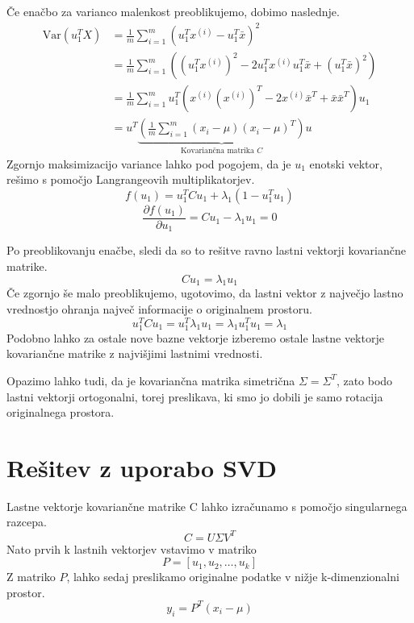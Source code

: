 Če enačbo za varianco malenkost preoblikujemo, dobimo naslednje. \cite{zupan2024uozp}
\begin{equation}
\begin{aligned}
\mathrm{Var}(u_1^TX) &= \frac{1}{m}\sum_{i=1}^{m}(u_1^Tx^{(i)} - u_1^T\bar{x})^2 \\
&= \frac{1}{m}\sum_{i=1}^{m}\left((u_1^Tx^{(i)})^2 - 2u_1^Tx^{(i)}u_1^T\bar{x} + (u_1^T\bar{x})^2\right) \\
&= \frac{1}{m}\sum_{i=1}^{m}u_1^T\left(x^{(i)}(x^{(i)})^T - 2x^{(i)}\bar{x}^T + \bar{x}\bar{x}^T\right)u_1 \\
&= u^T \underbrace{\left( \frac{1}{m} \sum_{i=1}^{m} (x_i - \mu)(x_i - \mu)^T \right)}_{\text{Kovariančna matrika } C} u
\end{aligned}
\end{equation}
Zgornjo maksimizacijo variance lahko pod pogojem, da je $u_1$ enotski vektor, rešimo s pomočjo Langrangeovih multiplikatorjev.
\begin{equation}
f(u_1) = u_1^T C u_1 + \lambda_1 (1 - u_1^T u_1)
\end{equation}
\begin{equation}
\frac{\partial f(u_1)}{\partial u_1} = C u_1 - \lambda_1 u_1 = 0
\end{equation}

Po preoblikovanju enačbe, sledi da so to rešitve ravno lastni vektorji kovariančne matrike.
\begin{equation}
C u_1 = \lambda_1 u_1
\end{equation}
Če zgornjo še malo preoblikujemo, ugotovimo, da lastni vektor z največjo lastno vrednostjo ohranja največ informacije o originalnem prostoru.
\begin{equation}
    u_1^T C u_1 = u_1^T \lambda_1 u_1 = \lambda_1 u_1^T u_1 = \lambda_1
\end{equation}
Podobno lahko za ostale nove bazne vektorje izberemo ostale lastne vektorje kovariančne matrike z najvišjimi lastnimi vrednosti.

Opazimo lahko tudi, da je kovariančna matrika simetrična $\Sigma = \Sigma^T$, zato bodo lastni vektorji ortogonalni, torej preslikava, ki smo jo dobili je samo rotacija originalnega prostora.

\section{Rešitev z uporabo SVD}
Lastne vektorje kovariančne matrike C lahko izračunamo s pomočjo singularnega razcepa. \cite{zupan2024uozp}
\begin{equation}
    C = U \Sigma V^T
\end{equation}
Nato prvih k lastnih vektorjev vstavimo v matriko
\begin{equation}
    P = [u_1, u_2, \dots, u_k]
\end{equation}
Z matriko $P$, lahko sedaj preslikamo originalne podatke v nižje k-dimenzionalni prostor. 
\begin{equation}
y_i = P^T (x_i - \mu)
\end{equation}  